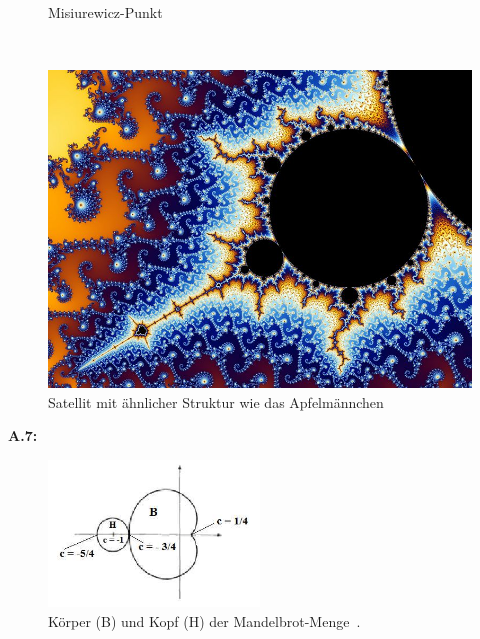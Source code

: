 \begin{figure}[H]
\begin{minipage}[t]{0.40\textwidth}
    \vspace*{-4ex}
    \caption{Misiurewicz-Punkt~\cite{beyer_partial_2005-3}}
    \label{app:6.4}
  \end{minipage}
  \\[4ex]
  \begin{minipage}[t]{\textwidth}
    \centering
    \includegraphics[width=0.45\linewidth]{images/zoom/800px-Mandel_zoom_08_satellite_antenna}
    \vspace*{-2ex}
    \caption{Satellit mit ähnlicher Struktur wie das Apfelm\"annchen~\cite{beyer_partial_2005-4}}
    \label{app:6.5}
  \end{minipage}
\end{figure}

\noindent\textbf{A.7:}\label{app:7}
\begin{figure}[H]
\centering
\includegraphics[width=0.5\textwidth]{images/bodyHeadMandelbrotSet}
\caption{
  K\"orper (B) und Kopf (H) der Mandelbrot-Menge~\cite{mahanta_mandelbrot_2016}.
}
\label{fig:body-and-head-of-mandelbrot-set}
\end{figure}

